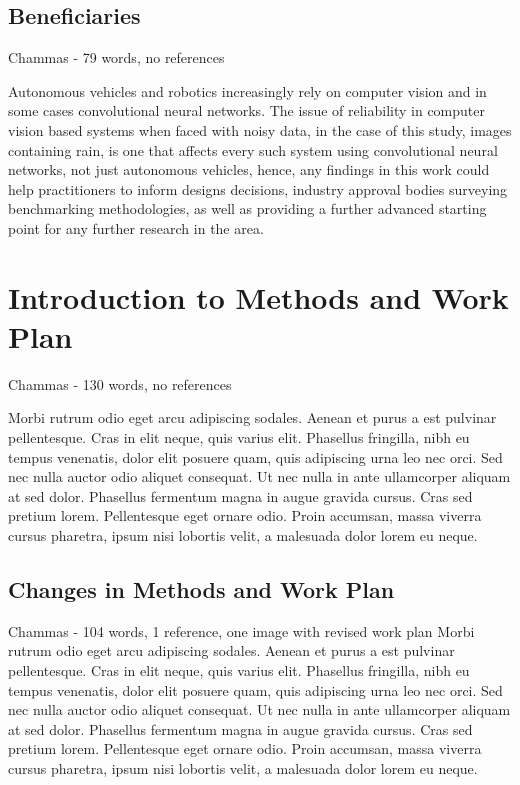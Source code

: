 \subsection{Beneficiaries}

Chammas - 79 words, no references

Autonomous vehicles and robotics increasingly rely on computer vision and in some cases convolutional neural networks. The issue of reliability in computer vision based systems when faced with noisy data, in the case of this study, images containing rain, is one that affects every such system using convolutional neural networks, not just autonomous vehicles, hence, any findings in this work could help practitioners to inform designs decisions, industry approval bodies surveying benchmarking methodologies, as well as providing a further advanced starting point for any further research in the area.


\section{Introduction to Methods and Work Plan}

Chammas - 130 words, no references

Morbi rutrum odio eget arcu adipiscing sodales. Aenean et purus a est pulvinar pellentesque. Cras in elit neque, quis varius elit. Phasellus fringilla, nibh eu tempus venenatis, dolor elit posuere quam, quis adipiscing urna leo nec orci. Sed nec nulla auctor odio aliquet consequat. Ut nec nulla in ante ullamcorper aliquam at sed dolor. Phasellus fermentum magna in augue gravida cursus. Cras sed pretium lorem. Pellentesque eget ornare odio. Proin accumsan, massa viverra cursus pharetra, ipsum nisi lobortis velit, a malesuada dolor lorem eu neque.


\subsection{Changes in Methods and Work Plan}

Chammas - 104 words, 1 reference, one image with revised work plan
Morbi rutrum odio eget arcu adipiscing sodales. Aenean et purus a est pulvinar pellentesque. Cras in elit neque, quis varius elit. Phasellus fringilla, nibh eu tempus venenatis, dolor elit posuere quam, quis adipiscing urna leo nec orci. Sed nec nulla auctor odio aliquet consequat. Ut nec nulla in ante ullamcorper aliquam at sed dolor. Phasellus fermentum magna in augue gravida cursus. Cras sed pretium lorem. Pellentesque eget ornare odio. Proin accumsan, massa viverra cursus pharetra, ipsum nisi lobortis velit, a malesuada dolor lorem eu neque.

